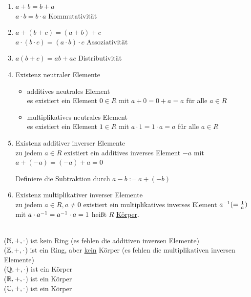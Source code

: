 \begin{enumerate}
	\item $a+b = b+a$\\
	$a\cdot b = b\cdot a$ \hfill Kommutativität
	
	\item $a+(b+c) = (a+b)+c$\\
	$a\cdot(b\cdot c) = (a\cdot b)\cdot c$ \hfill Assoziativität
	
	\item $a(b+c) = ab + ac$ \hfill Distributivität
	
	\item Existenz neutraler Elemente
	\begin{itemize}
		\item additives neutrales Element\\
		es existiert ein Element $0\in R$ mit $a+0=0+a=a$ für alle $a\in R$
		\item multiplikatives neutrales Element\\
		es existiert ein Element $1\in R$ mit $a\cdot 1=1\cdot a=a$ für alle $a\in R$
	\end{itemize}
	
	\item Existenz additiver inverser Elemente\\
	zu jedem $a\in R$ existiert ein additives inverses Element $-a$ mit $a+(-a) = (-a)+a = 0$
	
	Definiere die Subtraktion durch $a-b:=a+(-b)$
	
	\item Existenz multiplikativer inverser Elemente\\
	zu jedem $a\in R, a\ne 0$ existiert ein multiplikatives inverses Element ${a}^{-1}(=\frac{1}{a})$ mit $a\cdot {a}^{-1} = {a}^{-1}\cdot a = 1$ heißt $R$ \ul{Körper}.
\end{enumerate}

\Bsp \quad\\
($\mathbb{N},+,\cdot$) ist \ul{kein} Ring (es fehlen die additiven inversen Elemente)\\
($\mathbb{Z},+,\cdot$) ist ein Ring, aber \ul{kein} Körper (es fehlen die multiplikativen inversen Elemente)\\
($\mathbb{Q},+,\cdot$) ist ein Körper\\
($\mathbb{R},+,\cdot$) ist ein Körper\\
($\mathbb{C},+,\cdot$) ist ein Körper\\


